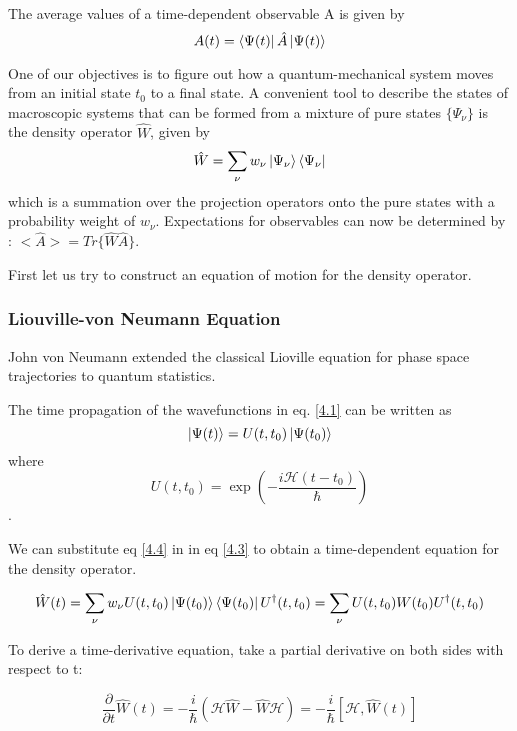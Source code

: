 The average values of a time-dependent observable A is given by \begin{equation} \label{4.2} A(t) = \bra{\Psi(t)} \hat{A} \ket{\Psi(t)} \end{equation}

One of our objectives is to figure out how a quantum-mechanical system moves from an initial state $t_0$ to a final state. A convenient tool to describe the states of macroscopic systems that can be formed from a mixture of pure states $\{ \Psi_{\nu} \}$ is the density operator $\hat{W}$, given by \begin{equation} \label{4.3} \hat{W} = \sum_{\nu} w_{\nu} \ket{\Psi_{\nu}} \bra{\Psi_{\nu}} \end{equation}which is a summation over the projection operators onto the pure states with a probability weight of $w_{\nu}$. Expectations for observables can now be determined by : $<\hat{A}> = Tr\{ \hat{W} \hat{A}\}$.

First let us try to construct an equation of motion for the density operator. 

\subsubsection{Liouville-von Neumann Equation}

John von Neumann extended the classical Lioville equation for phase space trajectories to quantum statistics.

The time propagation of the wavefunctions in eq. \ref{4.1} can be written as \begin{equation} \label{4.4} \ket{\Psi(t)} = U(t, t_0) \ket{\Psi(t_0)} \end{equation} where $$U(t, t_0) = \exp(-\frac{i \mathcal{H}(t - t_0)}{\hbar})$$.

We can substitute eq \ref{4.4} in in eq \ref{4.3} to obtain a time-dependent equation for the density operator.

\begin{equation} \label{4.5}
    \hat{W}(t) = \sum_{\nu} w_{\nu} U(t, t_0) \ket{\Psi(t_0)} \bra{\Psi(t_0)} U^{\dag}(t, t_0) = \sum_{\nu} U(t, t_0) W(t_0) U^{\dag}(t, t_0)
\end{equation}

To derive a time-derivative equation, take a partial derivative on both sides with respect to t:

\begin{equation} \label{4.6}
    \frac{\partial}{\partial t} \hat{W}(t) = -\frac{i}{\hbar}(\mathcal{H} \hat{W} - \hat{W} \mathcal{H}) = -\frac{i}{\hbar}[\mathcal{H}, \hat{W}(t)]
\end{equation}

